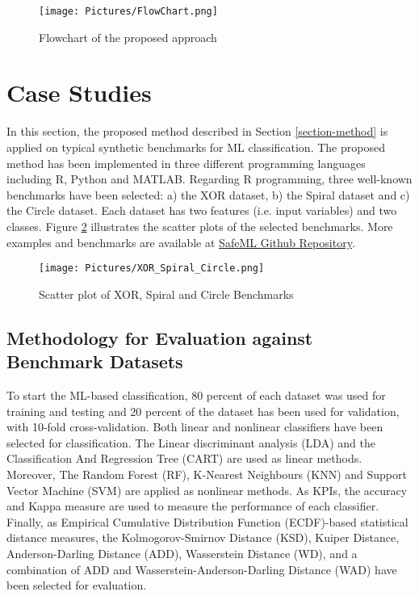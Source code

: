 \documentclass{article}
\begin{document}
\begin{figure}
\texttt{[image: Pictures/FlowChart.png]}
\caption{Flowchart of the proposed approach} \label{fig2}
\end{figure}

\section{Case Studies} \label{section-case-studies}
In this section, the proposed method described in Section \ref{section-method} is applied on typical synthetic benchmarks for ML classification.
The proposed method has been implemented in three different programming languages including R, Python and MATLAB. Regarding R programming, three well-known benchmarks have been selected: a) the XOR dataset, b) the Spiral dataset and c) the Circle dataset. Each dataset has two features (i.e. input variables) and two classes. Figure \ref{fig_Bench} illustrates the scatter plots of the selected benchmarks. More examples and benchmarks are available at \href{https://github.com/ISorokos/SafeML}{SafeML Github Repository}.

\begin{figure}
\texttt{[image: Pictures/XOR\_Spiral\_Circle.png]}
\caption{Scatter plot of XOR, Spiral and Circle Benchmarks} \label{fig_Bench}
\end{figure}

\subsection{Methodology for Evaluation against Benchmark Datasets}

To start the ML-based classification, 80 percent of each dataset was used for training and testing and 20 percent of the dataset has been used for validation, with 10-fold cross-validation. Both linear and nonlinear classifiers have been selected for classification. The Linear discriminant analysis (LDA) and the Classification And Regression Tree (CART) are used as linear methods. Moreover, The Random Forest (RF), K-Nearest Neighbours (KNN) and Support Vector Machine (SVM) are applied as nonlinear methods.  As KPIs, the accuracy and Kappa measure are used to measure the performance of each classifier. Finally, as Empirical Cumulative Distribution Function (ECDF)-based statistical distance measures, the Kolmogorov-Smirnov Distance (KSD), Kuiper Distance, Anderson-Darling Distance (ADD), Wasserstein Distance (WD), and a combination of ADD and Wasserstein-Anderson-Darling Distance (WAD) have been selected for evaluation. 
\end{document}
